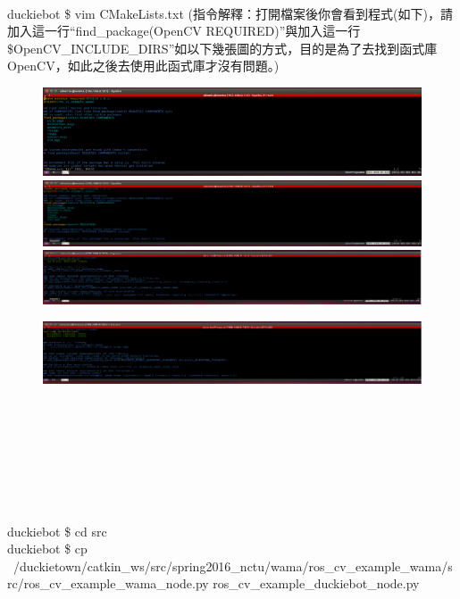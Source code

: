 \documentclass{article}
\begin{document}
\\
duckiebot \$ vim CMakeLists.txt 
(指令解釋：打開檔案後你會看到程式(如下)，請加入這一行“find\_package(OpenCV REQUIRED)”與加入這一行\${OpenCV\_INCLUDE\_DIRS}”如以下幾張圖的方式，目的是為了去找到函式庫OpenCV，如此之後去使用此函式庫才沒有問題。)
\begin{figure}[htp]
    \begin{center}
        \includegraphics[width=400pt]{pic/5_2_6.png}
        \includegraphics[width=400pt]{pic/5_2_7.png}
        \includegraphics[width=400pt]{pic/5_2_8.png}
    \end{center}
\end{figure}
\begin{figure}[htp]
    \begin{center}
        \includegraphics[width=400pt]{pic/5_2_9.png}
    \end{center}
\end{figure}
\\
\\\\\\\\\\\\duckiebot \$ cd src
\\duckiebot \$ cp ~/duckietown/catkin\_ws/src/spring2016\_nctu/wama/ros\_cv\_example\_wama/src/ros\_cv\_example\_wama\_node.py ros\_cv\_example\_duckiebot\_node.py 
\end{document}
